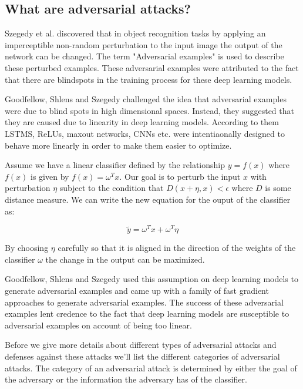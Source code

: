 \documentclass[journal,onecolumn]{IEEEtran}
\begin{document}
\subsection{What are adversarial attacks?}
Szegedy et al. \cite{szegedy_intriguing_2013} discovered that in object recognition tasks by applying an imperceptible non-random perturbation to the input image the output of the network can be changed. The term "Adversarial examples" is used to describe these perturbed examples. These adversarial examples were attributed to the fact that there are blindspots in the training process for these deep learning models.

Goodfellow, Shlens and Szegedy \cite{goodfellow_explaining_2014} challenged the idea that adversarial examples were due to blind spots in high dimensional spaces. Instead, they suggested that they are caused due to linearity in deep learning models. According to them LSTMS, ReLUs, maxout networks, CNNs etc. were intentiaonally designed to behave more linearly in order to make them easier to optimize. 

Assume we have a linear classifier defined by the relationship $y = f(x)$ where $f(x)$ is given by $f(x) = \omega^{T}x$. Our goal is to perturb the input $x$ with perturbation $\eta$ subject to the condition that $D(x+\eta,x)<\epsilon$ where $D$ is some distance measure. We can write the new equation for the ouput of the classifier as:

\begin{equation}
\tilde{y} = \omega^{T}x + \omega^{T}\eta
\end{equation}

By choosing $\eta$ carefully so that it is aligned in the direction of the weights of the classifier $\omega$ the change in the output can be maximized. 

Goodfellow, Shlens and Szegedy \cite{goodfellow_explaining_2014} used this assumption on deep learning models to generate adversarial examples and came up with a family of fast gradient approaches to generate adversarial examples. The success of these adversarial examples lent credence to the fact that deep learning models are susceptible to adversarial examples on account of being too linear.

Before we give more details about different types of adversarial attacks and defenses against these attacks we'll list the different categories of adversarial attacks. The category of an adversarial attack is determined by either the goal of the adversary or the information the adversary has of the classifier.
\end{document}
